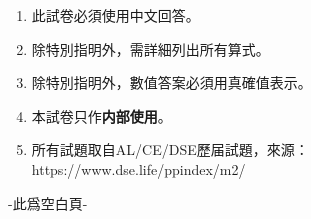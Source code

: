 \documentclass[12pt]{article}
\begin{document}
    \begin{enumerate}
        \item 此試卷必須使用中文回答。
        \item 除特別指明外，需詳細列出所有算式。
        \item 除特別指明外，數值答案必須用真確值表示。
        \item 本試卷只作\textbf{内部使用}。
        \item 所有試題取自AL/CE/DSE歷届試題，來源： https://www.dse.life/ppindex/m2/
    \end{enumerate}
    \newpage
    \thispagestyle{empty}
    \vspace*{\fill}
    \begin{center}
        -此爲空白頁-
    \end{center}
    \vspace*{\fill}
    \newpage
    \setcounter{page}{1}
\end{document}
